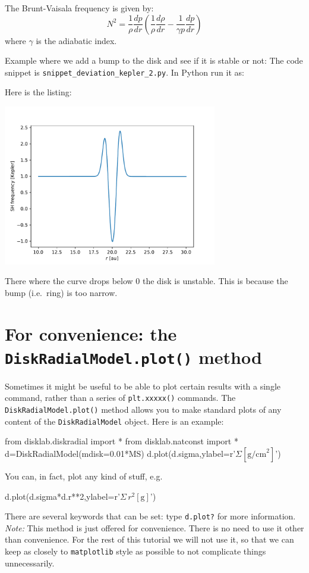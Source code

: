 \documentclass{book}
\newcommand{\code}[1]{{\small\tt #1}}
\begin{document}
The Brunt-Vaisala frequency is given by:
\begin{equation}
  N^2    = \frac{1}{\rho}\frac{dp}{dr}\left(\frac{1}{\rho}\frac{d\rho}{dr}-
  \frac{1}{\gamma p}\frac{dp}{dr}\right)
\end{equation}
where $\gamma$ is the adiabatic index.

Example where we add a bump to the disk and see if it is stable or not:
The code snippet is
\code{snippet\_deviation\_kepler\_2.py}. In Python run it as:
\begin{codebox}
\end{codebox}
Here is the listing:

\centerline{\includegraphics[width=0.7\textwidth]{../snippets/fig_snippet_deviation_kepler_2_1.pdf}}
There where the curve drops below 0 the disk is unstable. This is because the
bump (i.e.~ring) is too narrow.


\section{For convenience: the {\tt DiskRadialModel.plot()} method}\label{sec-disk-standard-plot}
Sometimes it might be useful to be able to plot certain results with a single
command, rather than a series of \code{plt.xxxxx()} commands. The \code{DiskRadialModel.plot()}
method allows you to make standard plots of any content of the \code{DiskRadialModel} object.
Here is an example:
\begin{codebox}
from disklab.diskradial import *
from disklab.natconst import *
d=DiskRadialModel(mdisk=0.01*MS)
d.plot(d.sigma,ylabel=r'$\Sigma [\mathrm{g/cm}^2]$')
\end{codebox}
You can, in fact, plot any kind of stuff, e.g.
\begin{codebox}
d.plot(d.sigma*d.r**2,ylabel=r'$\Sigma\,r^2 [\mathrm{g}]$')
\end{codebox}
There are several keywords that can be set: type \code{d.plot?} for more information.
{\em Note:} This method is just offered for convenience. There is no need to use it
other than convenience. For the rest of this tutorial we will not use it, so that
we can keep as closely to \code{matplotlib} style as possible to not complicate things
unnecessarily.
\end{document}
